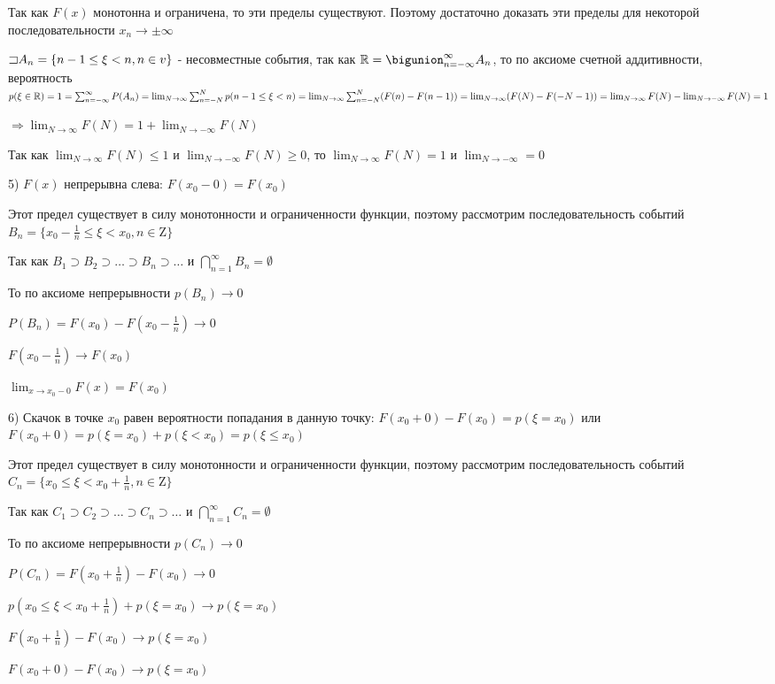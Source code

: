 \documentclass[12pt]{article}
\begin{document}
    \begin{MyProof}
        Так как $F(x)$ монотонна и ограничена, то эти пределы существуют. Поэтому достаточно доказать эти пределы для некоторой последовательности $x_n \to \pm \infty$

        $\mathord{\sqsupset} A_n = \{n - 1 \leq \xi < n, n \in v\}$ - несовместные события, так как $\Real = \bigunion_{n = -\infty}^\infty A_n$, то
        по аксиоме счетной аддитивности, вероятность $p(\xi \in \mathbb{R}) = 1 = \sum_{n = -\infty}^\infty P(A_n) = \lim_{N \to \infty} \sum_{n = -N}^N p(n - 1 \leq \xi < n) = 
        \lim_{N \to \infty} \sum_{n = -N}^N (F(n) - F(n - 1)) = \lim_{N \to \infty} (F(N) - F(-N - 1)) = \lim_{N \to \infty} F(N) - \lim_{N \to -\infty} F(N) = 1$

        $\Longrightarrow \lim_{N \to \infty} F(N) = 1 + \lim_{N \to -\infty} F(N) $

        Так как $\lim_{N \to \infty} F(N) \leq 1$ и $\lim_{N \to -\infty} F(N) \geq 0$, то $\lim_{N \to \infty} F(N) = 1$ и $\lim_{N \to -\infty} = 0$
    \end{MyProof}
    
    5) $F(x)$ непрерывна слева: $F(x_0 - 0) = F(x_0)$

    \begin{MyProof}
        Этот предел существует в силу монотонности и ограниченности функции, поэтому рассмотрим последовательность событий $B_n = \{x_0 - \frac{1}{n} \leq \xi < x_0, n \in \mathrm{Z}\}$

        Так как $B_1 \supset B_2 \supset \dots \supset B_n \supset \dots$ и $\bigcap_{n = 1}^\infty B_n = \emptyset$

        То по аксиоме непрерывности $p(B_n) \to 0$

        $P(B_n) = F(x_0) - F(x_0 - \frac{1}{n}) \rightarrow 0$

        $F(x_0 - \frac{1}{n}) \to F(x_0)$

        $\lim_{x \to x_0 - 0} F(x) = F(x_0)$
    \end{MyProof}
    
    6) Скачок в точке $x_0$ равен вероятности попадания в данную точку: $F(x_0 + 0) - F(x_0) = p(\xi = x_0)$ или $F(x_0 + 0) = p(\xi = x_0) + p(\xi < x_0) = p(\xi \leq x_0)$

    
    \begin{MyProof}
        Этот предел существует в силу монотонности и ограниченности функции, поэтому рассмотрим последовательность событий $C_n = \{x_0 \leq \xi < x_0 + \frac{1}{n}, n \in \mathrm{Z}\}$

        Так как $C_1 \supset C_2 \supset \dots \supset C_n \supset \dots$ и $\bigcap_{n = 1}^\infty C_n = \emptyset$

        То по аксиоме непрерывности $p(C_n) \to 0$

        $P(C_n) = F(x_0 + \frac{1}{n}) - F(x_0) \rightarrow 0$

        $p(x_0 \leq \xi < x_0 + \frac{1}{n}) + p(\xi = x_0) \rightarrow p(\xi = x_0)$

        $F(x_0 + \frac{1}{n}) - F(x_0) \to p(\xi = x_0)$

        $F(x_0 + 0) - F(x_0) \to p(\xi = x_0)$
    \end{MyProof}
    
\end{document}
